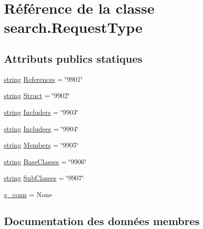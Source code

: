 \hypertarget{classsearch_1_1_request_type}{}\section{Référence de la classe search.\+Request\+Type}
\label{classsearch_1_1_request_type}
\subsection*{Attributs publics statiques}
\begin{DoxyCompactItemize}
\item 
\hyperlink{tclscanner_8cpp_a3b18665bed369c4cf583afc1b05f583a}{string} \hyperlink{classsearch_1_1_request_type_ac366ecff13e29a1e9de0626e72a10e15}{References} = \char`\"{}9901\char`\"{}
\item 
\hyperlink{tclscanner_8cpp_a3b18665bed369c4cf583afc1b05f583a}{string} \hyperlink{classsearch_1_1_request_type_a6db1aa20748192d736732e4f19b3a6f2}{Struct} = \char`\"{}9902\char`\"{}
\item 
\hyperlink{tclscanner_8cpp_a3b18665bed369c4cf583afc1b05f583a}{string} \hyperlink{classsearch_1_1_request_type_adc2057e46c1a24a5fdc5f6b55e06b5e6}{Includers} = \char`\"{}9903\char`\"{}
\item 
\hyperlink{tclscanner_8cpp_a3b18665bed369c4cf583afc1b05f583a}{string} \hyperlink{classsearch_1_1_request_type_a33ea51680ef2f9b512541dd64a2384b2}{Includees} = \char`\"{}9904\char`\"{}
\item 
\hyperlink{tclscanner_8cpp_a3b18665bed369c4cf583afc1b05f583a}{string} \hyperlink{classsearch_1_1_request_type_a610b07848237d0ae74a6d2df7876db02}{Members} = \char`\"{}9905\char`\"{}
\item 
\hyperlink{tclscanner_8cpp_a3b18665bed369c4cf583afc1b05f583a}{string} \hyperlink{classsearch_1_1_request_type_afff38a669aa416f1dbed3d5e892e59ff}{Base\+Classes} = \char`\"{}9906\char`\"{}
\item 
\hyperlink{tclscanner_8cpp_a3b18665bed369c4cf583afc1b05f583a}{string} \hyperlink{classsearch_1_1_request_type_a9bab5f69fb129e5a373ee06284ce615b}{Sub\+Classes} = \char`\"{}9907\char`\"{}
\item 
\hyperlink{classsearch_1_1_request_type_abfc413f7c4f1bc482968c2f18c06fcee}{g\+\_\+conn} = None
\end{DoxyCompactItemize}


\subsection{Documentation des données membres}
\hypertarget{classsearch_1_1_request_type_afff38a669aa416f1dbed3d5e892e59ff}{}
